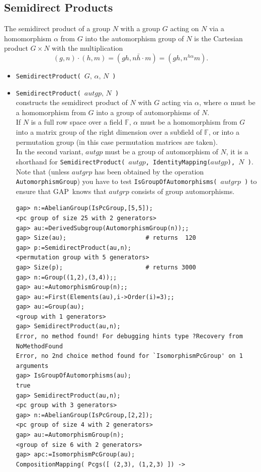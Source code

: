 \documentclass[11pt]{amsart}
\newcommand{\gap}{GAP}   %
\theoremstyle{plain}
\newcommand{\codesize}{\footnotesize}
\newcommand{\<}{\ensuremath{\langle}}
\renewcommand{\>}{\ensuremath{\rangle}}
\newcommand{\F}{\ensuremath{\mathbb{F}}}
\begin{document}
\subsection{Semidirect Products}
The semidirect product of a group $N$
with a group $G$ acting on $N$ via a homomorphism $\alpha$ from $G$ into
the automorphism group of $N$ is the Cartesian product $G \times N$ with the
multiplication 
\[
(g, n) \cdot (h, m) = (gh, n\bar{h} \cdot m)= (gh, n^{h\alpha} m).
\]
\begin{itemize}
\item {\tt SemidirectProduct( $G, \, \alpha, \, N$ )}
\item {\tt SemidirectProduct( $autgp, \, N$ )}\\[2pt]
constructs the semidirect product of $N$ with $G$ acting via $\alpha$, where $\alpha$
must be a homomorphism from $G$ into a group of automorphisms of $N$.
\\[5pt]
If $N$ is a full row space over a field $\F$, $\alpha$ must be a homomorphism from
$G$ into a matrix group of the right dimension over a subfield of $\F$, or into a
permutation group (in this case permutation matrices are taken).
\\[5pt]
In the second variant, $autgp$ must be a group of automorphism of $N$, it is a
shorthand for {\tt SemidirectProduct( $autgp$, IdentityMapping($autgp$), $N$ )}. Note
that (unless $autgrp$ has been obtained by the operation  {\tt AutomorphismGroup})
you have to test {\tt IsGroupOfAutomorphisms( $autgrp$ )} to ensure that \gap\ knows that 
$autgrp$ consists of group automorphisms.
{\codesize
\begin{verbatim}
gap> n:=AbelianGroup(IsPcGroup,[5,5]);
<pc group of size 25 with 2 generators>
gap> au:=DerivedSubgroup(AutomorphismGroup(n));;
gap> Size(au);                      # returns  120
gap> p:=SemidirectProduct(au,n);
<permutation group with 5 generators>
gap> Size(p);                       # returns 3000
gap> n:=Group((1,2),(3,4));;
gap> au:=AutomorphismGroup(n);;
gap> au:=First(Elements(au),i->Order(i)=3);;
gap> au:=Group(au);
<group with 1 generators>
gap> SemidirectProduct(au,n);
Error, no method found! For debugging hints type ?Recovery from NoMethodFound
Error, no 2nd choice method found for `IsomorphismPcGroup' on 1 arguments
gap> IsGroupOfAutomorphisms(au);
true
gap> SemidirectProduct(au,n);
<pc group with 3 generators>
gap> n:=AbelianGroup(IsPcGroup,[2,2]);
<pc group of size 4 with 2 generators>
gap> au:=AutomorphismGroup(n);
<group of size 6 with 2 generators>
gap> apc:=IsomorphismPcGroup(au);
CompositionMapping( Pcgs([ (2,3), (1,2,3) ]) ->

\end{verbatim}}
\end{itemize}
\end{document}
